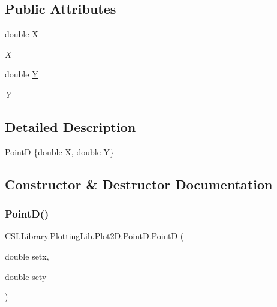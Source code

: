 \subsection*{Public Attributes}
\begin{DoxyCompactItemize}
\item 
double \mbox{\hyperlink{struct_c_s_i_1_1_library_1_1_plotting_lib_1_1_plot2_d_1_1_point_d_a9e756f78e0c2177f71e0a2ece0c77670}{X}}
\begin{DoxyCompactList}\small\item\em X \end{DoxyCompactList}\item 
double \mbox{\hyperlink{struct_c_s_i_1_1_library_1_1_plotting_lib_1_1_plot2_d_1_1_point_d_af42801968d615d901d55db3851d6597a}{Y}}
\begin{DoxyCompactList}\small\item\em Y \end{DoxyCompactList}\end{DoxyCompactItemize}


\subsection{Detailed Description}
\mbox{\hyperlink{struct_c_s_i_1_1_library_1_1_plotting_lib_1_1_plot2_d_1_1_point_d}{PointD}} \{double X, double Y\} 



\subsection{Constructor \& Destructor Documentation}
\mbox{\label{struct_c_s_i_1_1_library_1_1_plotting_lib_1_1_plot2_d_1_1_point_d_a506d1beedb1c98661e1d8d436167e1e3}} 
\subsubsection{\texorpdfstring{PointD()}{PointD()}}
{\footnotesize\ttfamily C\+S\+I.\+Library.\+Plotting\+Lib.\+Plot2\+D.\+Point\+D.\+PointD (\begin{DoxyParamCaption}\item[{double}]{setx,  }\item[{double}]{sety }\end{DoxyParamCaption})\hspace{0.3cm}{\ttfamily [inline]}}



